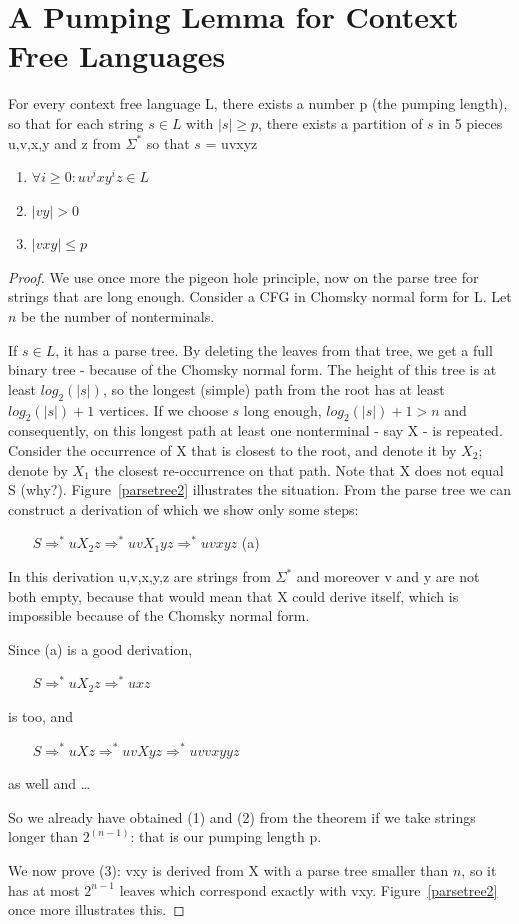 

\section{A Pumping Lemma for Context Free Languages}\label{pompcfl}

\begin{theorem}
For every context free language L, there exists a number p (the
pumping length), so that for each string $s \in L$ with $|s| \geq p$,
there exists a partition of $s$ in 5 pieces u,v,x,y and z from
$\Sigma^*$ so that $s$ = uvxyz
\begin{enumerate}
\item $\forall i \geq 0: uv^ixy^iz \in L$
\item $|vy| > 0$
\item $|vxy| \leq p$
\end{enumerate}
\end{theorem}
\begin{proof}
We use once more the pigeon hole principle, now on the parse tree for
strings that are long enough. Consider a CFG in Chomsky normal form
for L. Let $n$ be the number of nonterminals.

If $s \in L$, it has a parse tree. By deleting the
leaves from that tree, we get a full binary tree - because of the Chomsky normal
form. The height of this tree is at least $log_2(|s|)$, so the longest
(simple) path from the root has at least $log_2(|s|) + 1$ vertices. If
we choose $s$ long enough, $log_2(|s|) + 1 > n$ and consequently, on
this longest path at least one nonterminal - say X - is
repeated. Consider the occurrence of X that is closest to the root,
and denote it by $X_2$; denote by $X_1$ the closest re-occurrence on
that path. Note that X does not equal S
(why?). Figure~\ref{parsetree2} illustrates the situation. From the
parse tree we can construct a derivation of which we show only some
steps:


$~~~~~~~~S \Rightarrow^* uX_2z \Rightarrow^* uvX_1yz \Rightarrow^* uvxyz$ (a)

In this derivation u,v,x,y,z are strings from $\Sigma^*$ and moreover
v and y are not both empty, because that would mean that X could
derive itself, which is impossible because of the Chomsky normal form.

Since (a) is a good derivation,


$~~~~~~~~S \Rightarrow^* uX_2z \Rightarrow^* uxz$

is too, and



$~~~~~~~~S \Rightarrow^* uXz \Rightarrow^* uvXyz \Rightarrow^* uvvxyyz$


as well and \ldots

So we already have obtained (1) and (2) from the theorem if we take strings longer than $2^{(n-1)}$: that is our pumping length p.


We now prove (3): vxy is derived from X with a parse tree smaller than
$n$, so it has at most $2^{n-1}$ leaves which correspond exactly with
vxy. Figure~\ref{parsetree2} once more illustrates this.
\end{proof}

